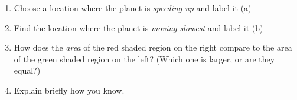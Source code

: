 \documentclass[12pt]{article}
\begin{document}
\begin{enumerate}
	\begin{enumerate}
		\item Choose a location where the planet is {\it speeding up} and label it (a)
		\item Find the location where the planet is {\it moving slowest} and label it (b)
		\item How does the {\it area} of the red shaded region on the right compare to the area of the green shaded region on the left? (Which one is larger, or are they equal?)
		
		\vspace{1in}
		
		\item Explain briefly how you know.
		
	\end{enumerate}


	\end{enumerate}

	
\end{document}
